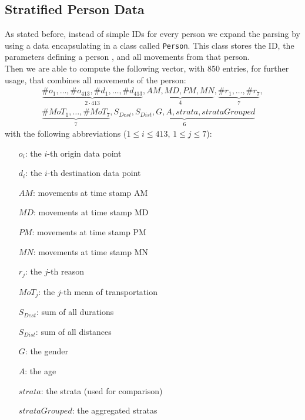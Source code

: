 \documentclass[runningheads]{llncs}
\begin{document}
	\subsection{Stratified Person Data}\label{subsec: person vector data}
	As stated before, instead of simple IDs for every person we expand the parsing by using a data encapsulating in a class called \texttt{Person}. This class stores the ID, the parameters defining a person %
	, and all movements from that person.\\
	Then we are able to compute the following vector, with 850 entries, for further usage, that combines all movements of the person:
	\begin{align*}
	\underbrace{\#o_1, \dots, \#o_{413}, \#d_1, \dots, \#d_{413}}_{2\cdot 413} ,
	\underbrace{\mathit{AM}, \mathit{MD}, \mathit{PM}, \mathit{MN}}_{4}, 
	\underbrace{\#r_1, \dots, \#r_7}_{7}, \\
	\underbrace{\#\mathit{MoT}_1, \dots, \#\mathit{MoT}_7}_{7}, \underbrace{\mathit{S_{Dest}}, \mathit{S_{Dist}}, \mathit{G}, \mathit{A} ,\mathit{strata}, \mathit{strataGrouped}}_{6}
	\end{align*}
	with the following abbreviations ($1 \le i \le 413$, $1 \le j \le 7$):
	\begin{multicols}{2}
		\begin{itemize}
			\setlength{\itemindent}{.4cm}
			\item[$o_i$:]  the $i$-th origin data point
			\item[$d_i$:]  the $i$-th destination data point
			\item[$\mathit{AM}$:] movements at time stamp AM
			\item[$\mathit{MD}$:] movements at time stamp MD
			\item[$\mathit{PM}$:] movements at time stamp PM
			\item[$\mathit{MN}$:] movements at time stamp MN
			\item[$r_j$:] the $j$-th reason
			\item[$\mathit{MoT}_j$:] the $j$-th mean of transportation
			\item[$\mathit{S_{Dest}}$:] sum of all durations
			\item[$\mathit{S_{Dist}}$:] sum of all distances
			\item[$\mathit{G}$:] the gender
			\item[$\mathit{A}$:] the age
			\item[$strata$:] the strata (used for comparison)
			\item[$strataGrouped$:] the aggregated stratas
		\end{itemize}
	\end{multicols}
\end{document}

